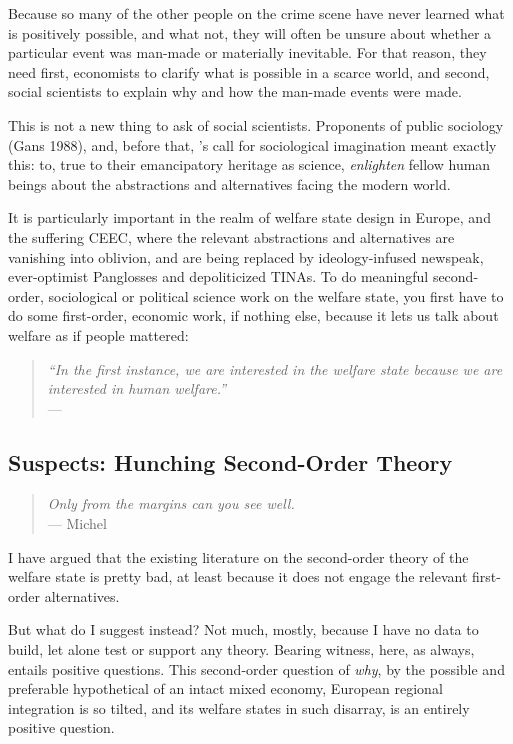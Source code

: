 \documentclass[11pt,a4paper,oneside,openright]{article}
\begin{document}
Because so many of the other people on the crime scene have never learned what is positively possible, and what not, they will often be unsure about whether a particular event was man-made or materially inevitable. 
For that reason, they need first, economists to clarify what is possible in a scarce world, and second, social scientists to explain why and how the man-made events were made.

This is not a new thing to ask of social scientists. 
Proponents of public sociology (Gans 1988), and, before that, \citeauthor{Mills-1959-aa}'s call for sociological imagination meant exactly this: 
to, true to their emancipatory heritage as science, \emph{enlighten} fellow human beings about the abstractions and alternatives facing the modern world.

It is particularly important in the realm of welfare state design in Europe, and the suffering \gls{CEEC}, where the relevant abstractions and alternatives are vanishing into oblivion, and are being replaced by ideology-infused newspeak, ever-optimist Panglosses and depoliticized TINAs. 
To do meaningful second-order, sociological or political science work on the welfare state, you first have to do some first-order, economic work, if nothing else, because it lets us talk about welfare as if people mattered:
\begin{quote}
	\emph{``In the first instance, we are interested in the welfare state because we are interested in human welfare.''}\\
	--- \cite[236]{Haggard2009}
\end{quote}

\subsection[Suspects]{Suspects: Hunching Second-Order Theory}

\begin{quote}
	\emph{Only from the margins can you see well.}\\
	--- Michel \cite{Foucault-1972-aa} 
\end{quote}

I have argued that the existing literature on the second-order theory of the welfare state is pretty bad, at least because it does not engage the relevant first-order alternatives. 

But what do I suggest instead? 
Not much, mostly, because I have no data to build, let alone test or support any theory. 
Bearing witness, here, as always, entails positive questions. 
This second-order question of \emph{why}, by the possible and preferable hypothetical of an intact mixed economy, European regional integration is so tilted, and its welfare states in such disarray, is an entirely positive question.
\end{document}
